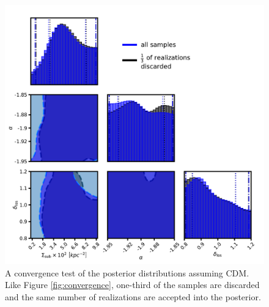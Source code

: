 \begin{figure}
	\includegraphics[clip,trim=0cm 0cm 0cm
	0cm,width=.95\textwidth,keepaspectratio]{./figures_wdmchillsout/CDM_convergencetest.pdf}
	\caption{\label{fig:convergence_CDM} A convergence test of the posterior distributions assuming CDM. Like Figure \ref{fig:convergence}, one-third of the samples are discarded and the same number of realizations are accepted into the posterior.}
\end{figure}

